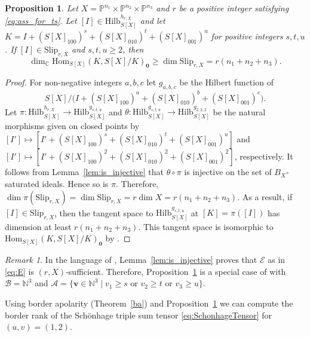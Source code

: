 \documentclass[12pt]{amsart}
\newtheorem{proposition}[theorem]{Proposition}
\theoremstyle{definition}
\theoremstyle{remark}
\newtheorem{remark}[theorem]{Remark}
\theoremstyle{definition}
\newcommand{\vv}{\mathbf{v}}
\newcommand{\oo}{\mathbf{0}}
\newcommand{\Hom}{\mathrm{Hom}}
\newcommand{\Slip}[2]{\mathrm{Slip}_{#1,#2}}
\newcommand{\CC}{\mathbb{C}}
\newcommand{\NN}{\mathbb{N}}
\newcommand{\Hilb}{\mathrm{Hilb}}
\begin{document}
\begin{proposition}\label{prop:ts_test}
Let $X=\mathbb{P}^{n_1}\times \mathbb{P}^{n_2}\times \mathbb{P}^{n_3}$ and $r$ be a positive integer satisfying \eqref{eq:ass_for_ts}. Let $[I]\in \Hilb_{S[X]}^{h_{r,X}}$ and let $K = I + (S[X]_{100})^s + (S[X]_{010})^t + (S[X]_{001})^u$ for positive integers $s,t,u$. If $[I]\in \Slip{r}{X}$ and $s,t,u\ge 2$, then
\[
\dim_\CC \Hom_{S[X]}(K, S[X]/K)_\oo\geq \dim \Slip{r}{X} = r(n_1+n_2+n_3).
\]
\end{proposition}
\begin{proof}
    For non-negative integers $a,b,c$ let $g_{a,b,c}$ be the Hilbert function of 
    \[
    S[X]/\big(I+(S[X]_{100})^a + (S[X]_{010})^b + (S[X]_{001})^c\big).
    \]
    Let $\pi\colon \Hilb_{S[X]}^{h_{r,X}} \to \Hilb_{S[X]}^{g_{s,t,u}}$ and $\theta\colon \Hilb_{S[X]}^{g_{s,t,u}} \to \Hilb_{S[X]}^{g_{2,2,2}}$
    be the natural morphisms given on closed points by $[I'] \mapsto [I'+(S[X]_{100})^s + (S[X]_{010})^t + (S[X]_{001})^u]$ and $[I']\mapsto [I'+(S[X]_{100})^2+(S[X]_{010})^2 + (S[X]_{001})^2]$, respectively. It follows from Lemma~\ref{lem:is_injective} that $\theta\circ \pi$ is injective on the set of $B_X$-saturated ideals. Hence so is $\pi$. Therefore, $\dim \pi(\Slip{r}{X}) = \dim \Slip{r}{X} = r\dim X = r(n_1+n_2+n_3)$. As a result, if $[I]\in \Slip{r}{X}$, then the tangent space to $\Hilb_{S[X]}^{g_{s,t,u}}$ at $[K] = \pi([I])$ has dimension at least $r(n_1+n_2+n_3)$. This tangent space is isomorphic to $\Hom_{S[X]}(K, S[X]/K)_\oo$ by \cite[Proposition~1.6]{HS04}. 
\end{proof}


\begin{remark}
In the language of \cite{Man23}, Lemma~\ref{lem:is_injective} proves that $\mathcal{E}$ as in \eqref{eq:E} is $(r,X)$-sufficient. Therefore, Proposition~\ref{prop:ts_test} is a special case of \cite[Proposition~5.2]{Man23} with $\mathcal{B} = \NN^3$ and $\mathcal{A} = \{\vv\in \NN^3 \mid v_1 \ge s \text{ or } v_2 \ge t \text{ or } v_3 \ge u\}$.
\end{remark}
 Using border apolarity (Theorem~\ref{ba}) and Proposition~\ref{prop:ts_test} we can compute the border rank of the Sch\"onhage triple sum  tensor \eqref{eq:SchonhageTensor} for $(u,v)=(1,2)$.
\end{document}
